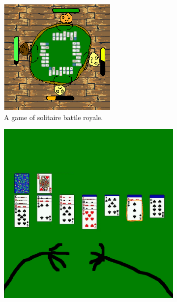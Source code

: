 \documentclass[a4paper,10pt,english]{article}
\begin{document}
\begin{figure}[h]

\centering

\begin{subfigure}{0.29\linewidth}
\includegraphics[width=\linewidth]{solitairebr1.png}
\caption{A game of solitaire battle royale.}
\label{Fig:Style1A}
\end{subfigure}\hfill
%
\begin{subfigure}{0.29\linewidth}
\includegraphics[width=\linewidth]{solitairebr2.png}

\end{subfigure}
\end{figure}
\end{document}
